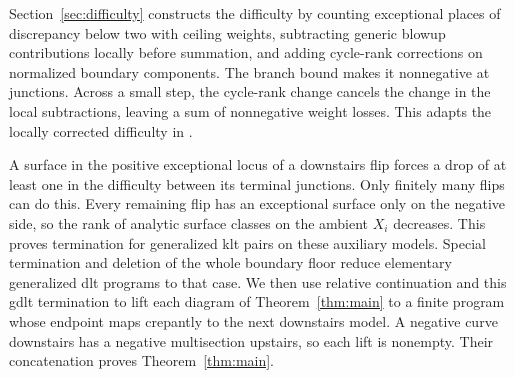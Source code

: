 Section~\ref{sec:difficulty} constructs the difficulty by counting exceptional places of discrepancy below two with ceiling weights, subtracting generic blowup contributions locally before summation, and adding cycle-rank corrections on normalized boundary components. The branch bound makes it nonnegative at junctions. Across a small step, the cycle-rank change cancels the change in the local subtractions, leaving a sum of nonnegative weight losses. This adapts the locally corrected difficulty in \cite[Section~4]{ProjectiveLCFourfolds}.

A surface in the positive exceptional locus of a downstairs flip forces a drop of at least one in the difficulty between its terminal junctions. Only finitely many flips can do this. Every remaining flip has an exceptional surface only on the negative side, so the rank of analytic surface classes on the ambient \(X_i\) decreases. This proves termination for generalized klt pairs on these auxiliary models. Special termination and deletion of the whole boundary floor reduce elementary generalized dlt programs to that case. We then use relative continuation and this gdlt termination to lift each diagram of Theorem~\ref{thm:main} to a finite program whose endpoint maps crepantly to the next downstairs model. A negative curve downstairs has a negative multisection upstairs, so each lift is nonempty. Their concatenation proves Theorem~\ref{thm:main}.
